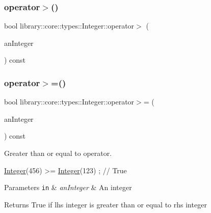 \subsubsection{\texorpdfstring{operator$>$()}{operator>()}\hspace{0.1cm}{\footnotesize\ttfamily [2/2]}}
{\footnotesize\ttfamily bool library\+::core\+::types\+::\+Integer\+::operator$>$ (\begin{DoxyParamCaption}\item[{const \hyperlink{classlibrary_1_1core_1_1types_1_1_integer_a623afb1580f870fd8a1997b1c12c917d}{Integer\+::\+Value\+Type} \&}]{an\+Integer }\end{DoxyParamCaption}) const}

\mbox{\label{classlibrary_1_1core_1_1types_1_1_integer_ae565ce34bef391725beebb42269d26fe}} 
\subsubsection{\texorpdfstring{operator$>$=()}{operator>=()}\hspace{0.1cm}{\footnotesize\ttfamily [1/2]}}
{\footnotesize\ttfamily bool library\+::core\+::types\+::\+Integer\+::operator$>$= (\begin{DoxyParamCaption}\item[{const \hyperlink{classlibrary_1_1core_1_1types_1_1_integer}{Integer} \&}]{an\+Integer }\end{DoxyParamCaption}) const}



Greater than or equal to operator. 


\begin{DoxyCode}
\hyperlink{classlibrary_1_1core_1_1types_1_1_integer_a6483b1c4e13e5ed6af5e7a58347efead}{Integer}(456) >= \hyperlink{classlibrary_1_1core_1_1types_1_1_integer_a6483b1c4e13e5ed6af5e7a58347efead}{Integer}(123) ; \textcolor{comment}{// True}
\end{DoxyCode}



\begin{DoxyParams}[1]{Parameters}
\mbox{\tt in}  & {\em an\+Integer} & An integer \\
\hline
\end{DoxyParams}
\begin{DoxyReturn}{Returns}
True if lhs integer is greater than or equal to rhs integer 
\end{DoxyReturn}
\mbox{\label{classlibrary_1_1core_1_1types_1_1_integer_a88077b530da644e33e6346837035eb9d}} 
